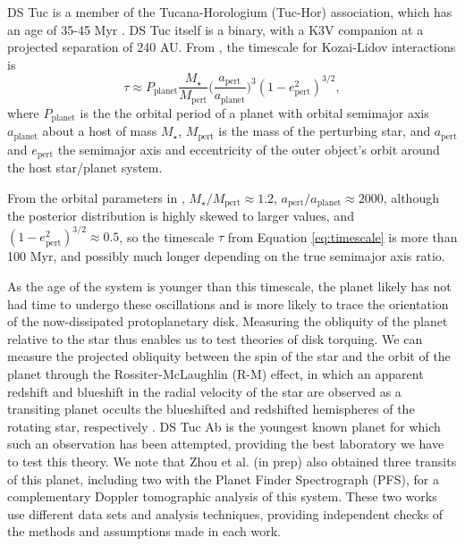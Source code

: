\documentclass[twocolumn]{aastex63}
\begin{document}
DS Tuc is a member of the Tucana-Horologium (Tuc-Hor) association, which has an age of 35-45 Myr \citep{Bell15, Crundall19}. 
DS Tuc itself is a binary, with a K3V companion at a projected separation of 240 AU. 
From \citet{Holman97}, the timescale for Kozai-Lidov interactions is
\begin{equation}
    \tau \approx P_\textrm{planet} \frac{M_\star}{M_\textrm{pert}} \bigg(\frac{a_\textrm{pert}}{a_\textrm{planet}}\bigg)^3 (1-e^2_\textrm{pert})^{3/2},
\label{eq:timescale}
\end{equation}
where $P_\textrm{planet}$ is the the orbital period of a planet with orbital semimajor axis  $a_\textrm{planet}$ about a host of mass $M_\star$, $M_\textrm{pert}$ is the
mass of the perturbing star, and $a_\textrm{pert}$ and $e_\textrm{pert}$ the semimajor axis and eccentricity of the outer object's orbit around the host star/planet system.


From the orbital parameters in \citet{Newton19}, ${M_\star}/{M_\textrm{pert}} \approx 1.2$, ${a_\textrm{pert}}/{a_\textrm{planet}} \approx 2000$, although the posterior distribution is highly skewed to larger values, and $(1-e^2_\textrm{pert})^{3/2} \approx 0.5$, so the timescale $\tau$ from Equation \ref{eq:timescale} is more than 100 Myr, and possibly much longer depending on the true semimajor axis ratio. 


As the age of the system is younger than this timescale, the planet likely has not had time to undergo these oscillations and is more likely to trace the orientation of the now-dissipated protoplanetary disk. 
Measuring the obliquity of the planet relative to the star thus enables us to test theories of disk torquing.
We can measure the projected obliquity between the spin of the star and the orbit of the planet through the Rossiter-McLaughlin (R-M) effect, in which an apparent redshift and blueshift in the radial velocity of the star are observed as a transiting planet occults the blueshifted and redshifted hemispheres of the rotating star, respectively \citep{Rossiter24, McLaughlin24}.
DS Tuc Ab is the youngest known planet for which such an observation has been attempted, providing the best laboratory we have to test this theory.
We note that Zhou et al. (in prep) also obtained three transits of this planet, including two with the Planet Finder Spectrograph (PFS), for a complementary Doppler tomographic analysis of this system. These two works use different data sets and analysis techniques, providing independent checks of the methods and assumptions made in each work.
\end{document}
